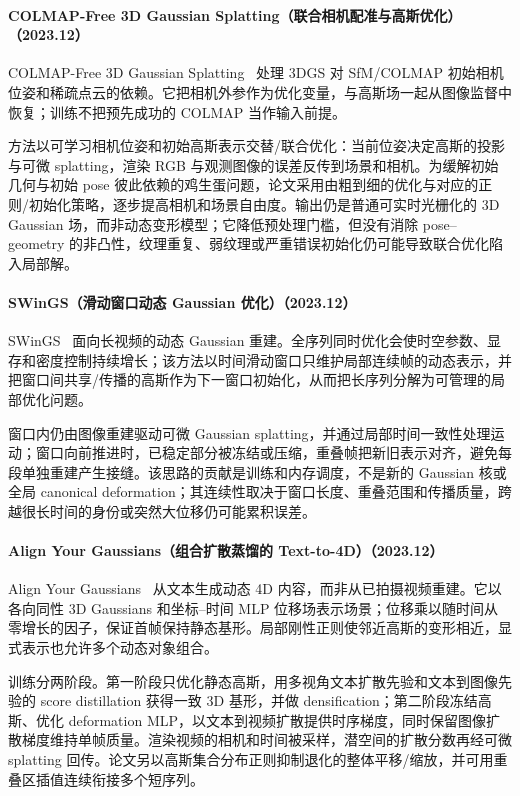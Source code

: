 \paragraph{COLMAP-Free 3D Gaussian Splatting（联合相机配准与高斯优化）（2023.12）}
COLMAP-Free 3D Gaussian Splatting~\cite{2312_07504} 处理 3DGS 对 SfM/COLMAP 初始相机位姿和稀疏点云的依赖。它把相机外参作为优化变量，与高斯场一起从图像监督中恢复；训练不把预先成功的 COLMAP 当作输入前提。

方法以可学习相机位姿和初始高斯表示交替/联合优化：当前位姿决定高斯的投影与可微 splatting，渲染 RGB 与观测图像的误差反传到场景和相机。为缓解初始几何与初始 pose 彼此依赖的鸡生蛋问题，论文采用由粗到细的优化与对应的正则/初始化策略，逐步提高相机和场景自由度。输出仍是普通可实时光栅化的 3D Gaussian 场，而非动态变形模型；它降低预处理门槛，但没有消除 pose--geometry 的非凸性，纹理重复、弱纹理或严重错误初始化仍可能导致联合优化陷入局部解。

\paragraph{SWinGS（滑动窗口动态 Gaussian 优化）（2023.12）}
SWinGS~\cite{2312_13308} 面向长视频的动态 Gaussian 重建。全序列同时优化会使时空参数、显存和密度控制持续增长；该方法以时间滑动窗口只维护局部连续帧的动态表示，并把窗口间共享/传播的高斯作为下一窗口初始化，从而把长序列分解为可管理的局部优化问题。

窗口内仍由图像重建驱动可微 Gaussian splatting，并通过局部时间一致性处理运动；窗口向前推进时，已稳定部分被冻结或压缩，重叠帧把新旧表示对齐，避免每段单独重建产生接缝。该思路的贡献是训练和内存调度，不是新的 Gaussian 核或全局 canonical deformation；其连续性取决于窗口长度、重叠范围和传播质量，跨越很长时间的身份或突然大位移仍可能累积误差。

\paragraph{Align Your Gaussians（组合扩散蒸馏的 Text-to-4D）（2023.12）}
Align Your Gaussians~\cite{2312_13763} 从文本生成动态 4D 内容，而非从已拍摄视频重建。它以各向同性 3D Gaussians 和坐标--时间 MLP 位移场表示场景；位移乘以随时间从零增长的因子，保证首帧保持静态基形。局部刚性正则使邻近高斯的变形相近，显式表示也允许多个动态对象组合。

训练分两阶段。第一阶段只优化静态高斯，用多视角文本扩散先验和文本到图像先验的 score distillation 获得一致 3D 基形，并做 densification；第二阶段冻结高斯、优化 deformation MLP，以文本到视频扩散提供时序梯度，同时保留图像扩散梯度维持单帧质量。渲染视频的相机和时间被采样，潜空间的扩散分数再经可微 splatting 回传。论文另以高斯集合分布正则抑制退化的整体平移/缩放，并可用重叠区插值连续衔接多个短序列。

